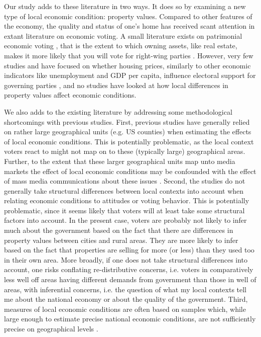 \documentclass[12pt,a4paper]{article}
\begin{document}
Our study adds to these literature in two ways. It does so by examining a new type of local economic condition: property values. Compared to other features of the economy, the quality and status of one's home has received scant attention in extant literature on economic voting. A small literature exists on patrimonial economic voting \citep{nadeau2010patrimonial,stubager2013reaching}, that is the extent to which owning assets, like real estate, makes it more likely that you will vote for right-wing parties \citep[see][for a similar argument]{ansell2014political}. However, very few studies and have focused on whether housing prices, similarly to other economic indicators like unemployment and GDP per capita, influence electoral support for governing parties \citep[e.g.][]{hopkins2015economic}, and no studies have looked at how local differences in property values affect economic conditions.

We also adds to the existing literature by addressing some methodological shortcomings with previous studies. First, previous studies have generally relied on rather large geographical units (e.g. US counties) when estimating the effects of local economic conditions. This is potentially problematic, as the local context voters react to might not map on to these (typically large) geographical areas. Further, to the extent that these larger geographical units map unto media markets the effect of local economic conditions may be confounded with the effect of mass media communications about these issues \citep[][]{dinesen2015reconsidering}. Second, the studies do not generally take structural differences between local contexts into account when relating economic conditions to  attitudes or voting behavior. This is potentially problematic, since it seems likely that voters will at least take some structural factors into account. In the present case, voters are probably not likely to infer much about the government based on the fact that there are differences in property values between cities and rural areas. They are more likely to infer based on the fact that properties are selling for more (or less) than they used too in their own area. More broadly, if one does not take structural differences into account, one risks conflating re-distributive concerns, i.e. voters in comparatively less well off areas having different demands from government than those in well of areas, with inferential concerns, i.e. the question of what my local contexts tell me about the national economy or about the quality of the government. Third,  measures of local economic conditions are often based on samples which, while large enough to estimate precise national economic conditions, are not sufficiently precise on geographical levels \citep[][]{healy2014presidential}. 
\end{document}
